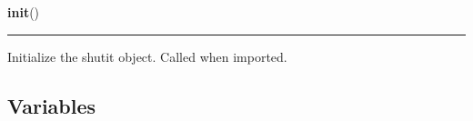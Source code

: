     \vspace{0.5ex}

\hspace{.8\funcindent}\begin{boxedminipage}{\funcwidth}

    \raggedright \textbf{init}()

    \vspace{-1.5ex}

    \rule{\textwidth}{0.5\fboxrule}
\setlength{\parskip}{2ex}
    Initialize the shutit object. Called when imported.

\setlength{\parskip}{1ex}
    \end{boxedminipage}



  \subsection{Variables}

